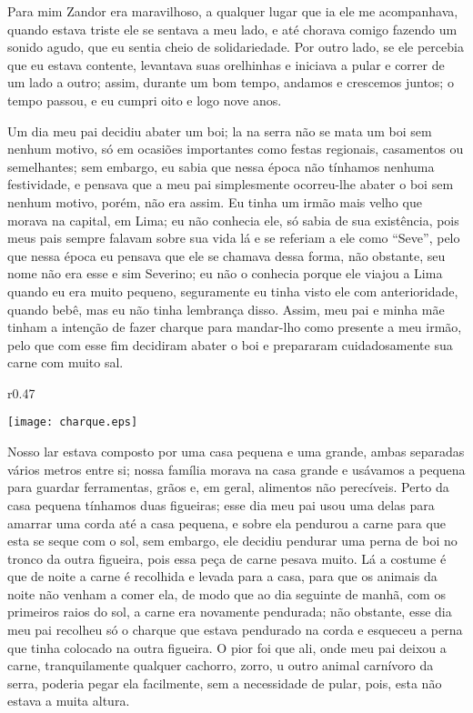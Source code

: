 Para mim Zandor era maravilhoso, a qualquer lugar que ia ele me acompanhava, quando estava triste ele se sentava a meu lado, e até chorava comigo fazendo um sonido agudo, que eu sentia cheio de solidariedade. 
Por outro lado, se ele percebia que eu estava contente, levantava suas orelhinhas e iniciava a pular e correr de um lado a outro; assim, durante um bom tempo, andamos e crescemos juntos; o tempo passou, e eu cumpri oito e logo nove anos.

Um dia meu pai decidiu abater um boi; la na serra não se mata um boi sem nenhum motivo, só em ocasiões importantes como festas regionais, casamentos ou semelhantes; sem embargo, eu sabia que nessa época não tínhamos nenhuma festividade, e pensava que a meu pai simplesmente ocorreu-lhe abater o boi sem nenhum motivo, porém, não era assim. 
Eu tinha um irmão mais velho que morava na capital, em Lima; eu não conhecia ele, só sabia de sua existência, pois meus pais sempre falavam sobre sua vida lá e se referiam a ele como ``Seve'', pelo que nessa época eu pensava que ele se chamava dessa forma, não obstante, seu nome não era esse e sim Severino; eu não o conhecia porque ele viajou a Lima quando eu era muito pequeno, seguramente eu tinha visto ele com anterioridade, quando bebê, mas eu não tinha lembrança disso. 
Assim, meu pai e minha mãe tinham a intenção de fazer charque para mandar-lho como presente a meu irmão, pelo que com esse fim decidiram abater o boi e prepararam cuidadosamente sua carne com muito sal.

\begin{wrapfigure}{r}{0.47\textwidth}
  \begin{center}
  \vspace{-20pt}
    \texttt{[image: charque.eps]}
  \end{center}
  \vspace{-20pt}
\end{wrapfigure}
Nosso lar estava composto por uma casa pequena e uma grande, ambas separadas vários metros entre si; nossa família morava na casa grande e usávamos a pequena para guardar ferramentas, grãos e, em geral, alimentos não perecíveis. Perto da casa pequena tínhamos duas figueiras; esse dia meu pai usou uma delas para amarrar uma corda até a casa pequena, e sobre ela pendurou a carne para que esta se seque com o sol, sem embargo, ele decidiu pendurar uma perna de boi no tronco da outra figueira, pois essa peça de carne pesava muito.
Lá a costume é que de noite a carne é recolhida e levada para a casa, para que os animais da noite não venham a comer ela, de modo que ao dia seguinte de manhã, com os primeiros raios do sol, a carne era novamente pendurada; não obstante, esse dia meu pai recolheu só o charque que estava pendurado na corda e esqueceu a perna que tinha colocado na outra figueira. 
O pior foi que ali, onde meu pai deixou a carne, tranquilamente qualquer cachorro, zorro, u outro animal carnívoro da serra, poderia pegar ela facilmente, sem a necessidade de pular, pois, esta não estava a muita altura.

